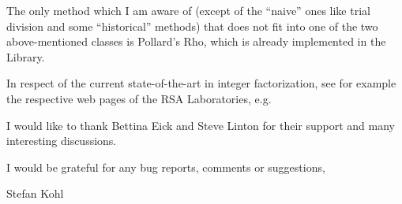The only method which I am aware of (except of the ``naive'' ones like
trial division and some ``historical'' methods)
that does not fit into one of the two above-mentioned
classes is
Pollard's Rho,
which is already implemented in the {\GAP}  Library.

In respect of the current state-of-the-art in integer factorization,
see for example the respective web pages of the 
RSA Laboratories, e.g.

I would like to thank Bettina Eick and Steve Linton for their support
and many interesting discussions.

I would be grateful for any bug reports, comments or suggestions,

\vfill%

\hfill                 Stefan Kohl

